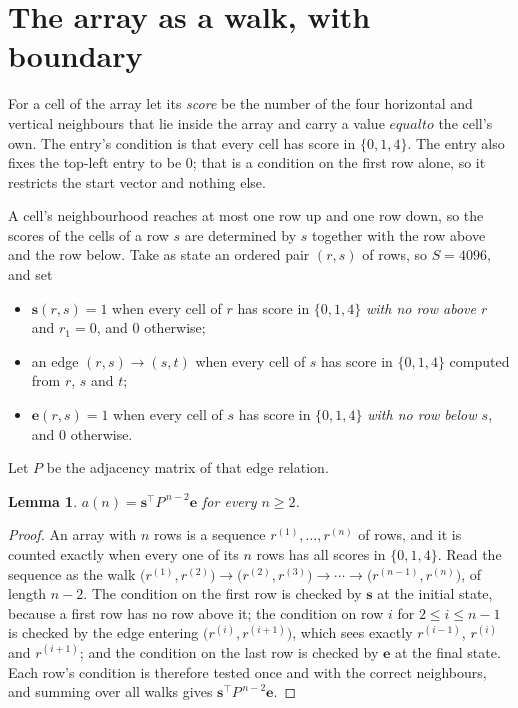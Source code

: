\documentclass[11pt,a4paper]{article}
\theoremstyle{plain}
\newtheorem{lemma}[theorem]{Lemma}
\theoremstyle{definition}
\begin{document}
\section{The array as a walk, with boundary}

For a cell of the array let its \emph{score} be the number of the four horizontal and vertical neighbours that lie inside
the array and carry a value $equal to$ the cell's own. The entry's condition is that every cell
has score in $\{0,1,4\}$. The entry also fixes the top-left entry to be $0$; that is a condition on the first row alone, so it restricts the start vector and nothing else.

A cell's neighbourhood reaches at most one row up and one row down, so the scores of the
cells of a row $s$ are determined by $s$ together with the row above and the row below.
Take as state an ordered pair $(r,s)$ of rows, so $S=4096$, and set
\begin{itemize}
\item $\mathbf{s}(r,s)=1$ when every cell of $r$ has score in $\{0,1,4\}$ \emph{with no row
above $r$} and $r_1=0$, and $0$ otherwise;
\item an edge $(r,s)\to(s,t)$ when every cell of $s$ has score in $\{0,1,4\}$ computed from
$r$, $s$ and $t$;
\item $\mathbf{e}(r,s)=1$ when every cell of $s$ has score in $\{0,1,4\}$ \emph{with no row
below $s$}, and $0$ otherwise.
\end{itemize}
Let $P$ be the adjacency matrix of that edge relation.

\begin{lemma}\label{lem:walk}
$a(n)=\mathbf{s}^{\!\top}P^{\,n-2}\mathbf{e}$ for every $n\ge2$.
\end{lemma}

\begin{proof}
An array with $n$ rows is a sequence $r^{(1)},\dots,r^{(n)}$ of rows, and it is counted
exactly when every one of its $n$ rows has all scores in $\{0,1,4\}$. Read the sequence as the
walk $\bigl(r^{(1)},r^{(2)}\bigr)\to\bigl(r^{(2)},r^{(3)}\bigr)\to\cdots\to
\bigl(r^{(n-1)},r^{(n)}\bigr)$, of length $n-2$. The condition on the first row is
checked by $\mathbf{s}$ at the initial state, because a first row has no row above it; the
condition on row $i$ for $2\le i\le n-1$ is checked by the edge entering
$\bigl(r^{(i)},r^{(i+1)}\bigr)$, which sees exactly $r^{(i-1)}$, $r^{(i)}$ and
$r^{(i+1)}$; and the condition on the last row is checked by $\mathbf{e}$ at the final
state. Each row's condition is therefore tested once and with the correct neighbours, and
summing over all walks gives $\mathbf{s}^{\!\top}P^{\,n-2}\mathbf{e}$.
\end{proof}
\end{document}
